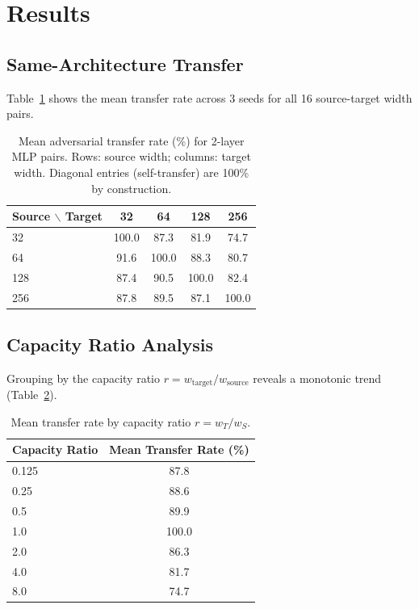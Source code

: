 \documentclass[11pt,a4paper]{article}
\begin{document}
\section{Results}

\subsection{Same-Architecture Transfer}

Table~\ref{tab:heatmap} shows the mean transfer rate across 3 seeds for all 16 source-target width pairs.

\begin{table}[h]
\centering
\caption{Mean adversarial transfer rate (\%) for 2-layer MLP pairs. Rows: source width; columns: target width. Diagonal entries (self-transfer) are 100\% by construction.}
\label{tab:heatmap}
\begin{tabular}{lcccc}
\toprule
Source $\backslash$ Target & 32 & 64 & 128 & 256 \\
\midrule
32  & 100.0 & 87.3 & 81.9 & 74.7 \\
64  & 91.6  & 100.0 & 88.3 & 80.7 \\
128 & 87.4  & 90.5  & 100.0 & 82.4 \\
256 & 87.8  & 89.5  & 87.1  & 100.0 \\
\bottomrule
\end{tabular}
\end{table}

\subsection{Capacity Ratio Analysis}

Grouping by the capacity ratio $r = w_{\text{target}} / w_{\text{source}}$ reveals a monotonic trend (Table~\ref{tab:ratio}).

\begin{table}[h]
\centering
\caption{Mean transfer rate by capacity ratio $r = w_T / w_S$.}
\label{tab:ratio}
\begin{tabular}{lc}
\toprule
Capacity Ratio & Mean Transfer Rate (\%) \\
\midrule
0.125 & 87.8 \\
0.25  & 88.6 \\
0.5   & 89.9 \\
1.0   & 100.0 \\
2.0   & 86.3 \\
4.0   & 81.7 \\
8.0   & 74.7 \\
\bottomrule
\end{tabular}
\end{table}
\end{document}
